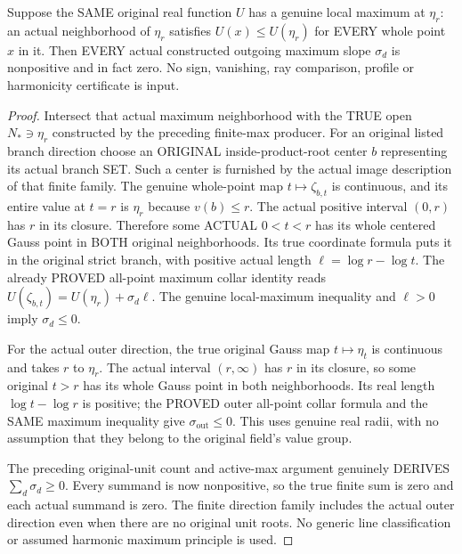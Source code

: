 \begin{theorem}
\label{analytic:actual-original-unit-max-local-maximum-slopes}
\leanok
{}
Suppose the SAME original real function $U$ has a genuine local maximum at
$\eta_r$: an actual neighborhood of $\eta_r$ satisfies $U(x)\le U(\eta_r)$
for EVERY whole point $x$ in it. Then EVERY actual constructed outgoing
maximum slope $\sigma_d$ is nonpositive and in fact zero. No sign,
vanishing, ray comparison, profile or harmonicity certificate is input.
\end{theorem}
\begin{proof}
Intersect that actual maximum neighborhood with the TRUE open
$N_*\ni\eta_r$ constructed by the preceding finite-max producer.
For an original listed branch direction choose an ORIGINAL
inside-product-root center $b$ representing its actual branch SET. Such a
center is furnished by the actual image description of that finite family.
The genuine whole-point map $t\mapsto\zeta_{b,t}$ is continuous, and its
entire value at $t=r$ is $\eta_r$ because $v(b)\le r$.
The actual positive interval $(0,r)$ has $r$ in its closure. Therefore
some ACTUAL $0<t<r$ has its whole centered Gauss point in BOTH original
neighborhoods. Its true coordinate formula puts it in the original
strict branch, with positive actual length $\ell=\log r-\log t$.
The already PROVED all-point maximum collar identity reads
$U(\zeta_{b,t})=U(\eta_r)+\sigma_d\ell$.
The genuine local-maximum inequality and $\ell>0$ imply $\sigma_d\le0$.

For the actual outer direction, the true original Gauss map
$t\mapsto\eta_t$ is continuous and takes $r$ to $\eta_r$.
The actual interval $(r,\infty)$ has $r$ in its closure, so some original
$t>r$ has its whole Gauss point in both neighborhoods. Its real length
$\log t-\log r$ is positive; the PROVED outer all-point collar formula
and the SAME maximum inequality give $\sigma_{\mathrm{out}}\le0$.
This uses genuine real radii, with no assumption that they belong to the
original field's value group.

The preceding original-unit count and active-max argument genuinely
DERIVES $\sum_d\sigma_d\ge0$. Every summand is now nonpositive, so
the true finite sum is zero and each actual summand is zero. The finite
direction family includes the actual outer direction even when there are
no original unit roots. No generic line classification or assumed
harmonic maximum principle is used.
\end{proof}

